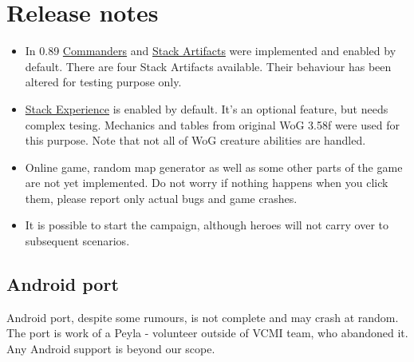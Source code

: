 \documentclass[a4size,final]{article}
\begin{document}
\section{Release notes}
\begin{itemize}
\item In 0.89 \hyperref[Commanders]{Commanders} and \hyperref[Stack_Artifacts]{Stack Artifacts} were implemented and enabled by default. There are four Stack Artifacts available. Their behaviour has been altered for testing purpose only.
\item \hyperref[Stack_Experience]{Stack Experience} is enabled by default. It's an optional feature, but needs complex tesing. Mechanics and tables from original WoG 3.58f were used for this purpose. Note that not all of WoG creature abilities are handled.
\item Online game, random map generator as well as some other parts of the game are not yet implemented. Do not worry if nothing happens when you click them, please report only actual bugs and game crashes.
\item It is possible to start the campaign, although heroes will not carry over to subsequent scenarios.
\end{itemize}
\subsection{Android port}
Android port, despite some rumours, is not complete and may crash at random. The port is work of a Peyla - volunteer outside of VCMI team, who abandoned it. Any Android support is beyond our scope.
\label{Feedback}
\end{document}
